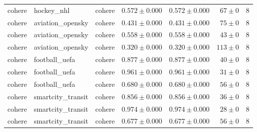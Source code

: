 \begin{table}[htbp]
\begin{tabular}{l l l r r r r}
cohere & hockey\_nhl & cohere & $0.572\pm0.000$ & $0.572\pm0.000$ & $67\pm0$ & 8 \\
cohere & aviation\_opensky & cohere & $0.431\pm0.000$ & $0.431\pm0.000$ & $75\pm0$ & 8 \\
cohere & aviation\_opensky & cohere & $0.558\pm0.000$ & $0.558\pm0.000$ & $43\pm0$ & 8 \\
cohere & aviation\_opensky & cohere & $0.320\pm0.000$ & $0.320\pm0.000$ & $113\pm0$ & 8 \\
cohere & football\_uefa & cohere & $0.877\pm0.000$ & $0.877\pm0.000$ & $40\pm0$ & 8 \\
cohere & football\_uefa & cohere & $0.961\pm0.000$ & $0.961\pm0.000$ & $31\pm0$ & 8 \\
cohere & football\_uefa & cohere & $0.680\pm0.000$ & $0.680\pm0.000$ & $56\pm0$ & 8 \\
cohere & smartcity\_transit & cohere & $0.856\pm0.000$ & $0.856\pm0.000$ & $36\pm0$ & 8 \\
cohere & smartcity\_transit & cohere & $0.974\pm0.000$ & $0.974\pm0.000$ & $28\pm0$ & 8 \\
cohere & smartcity\_transit & cohere & $0.677\pm0.000$ & $0.677\pm0.000$ & $56\pm0$ & 8 \\
\hline
\end{tabular}
\end{table}
